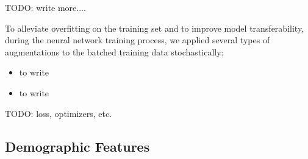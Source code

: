 TODO: write more....

To alleviate overfitting on the training set and to improve model transferability, during the neural network training process, we applied several types of augmentations to the batched training data stochastically:
\begin{itemize}
    \item to write
    \item to write
\end{itemize}

TODO: loss, optimizers, etc.

\subsection{Demographic Features}
\label{subsec:demo_feat}

